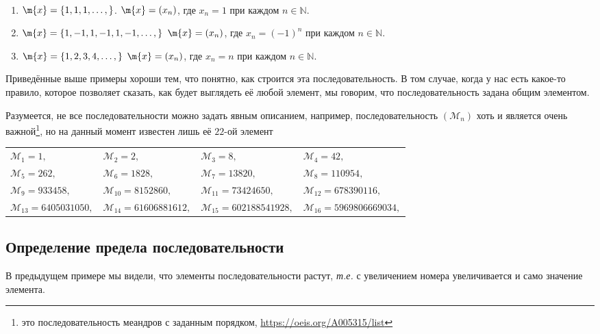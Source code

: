 \begin{example}~
    \begin{enumerate}
        \item $\m{x} = \{1,1,1,\ldots,\}$. \ie $\m{x} = (x_n)$, где $x_n = 1$ при каждом $n \in \mathbb{N}.$
        \item $\m{x} = \{1,-1,1,-1,1,-1,\ldots, \}$ \ie $\m{x} = (x_n)$, где $x_n = (-1)^n$ при каждом $n \in \mathbb{N}.$
        \item $\m{x} = \{1,2,3,4, \ldots,\}$ \ie $\m{x} = (x_n)$, где $x_n = n$ при каждом $n \in \mathbb{N}.$
    \end{enumerate}
\end{example}

Приведённые выше примеры хороши тем, что понятно, как строится эта последовательность. В том случае, когда у нас есть какое-то правило, которое позволяет сказать, как будет выглядеть её любой элемент, мы говорим, что последовательность задана общим элементом.

Разумеется, не все последовательности можно задать явным описанием, например, последовательность $(\mathscr{M}_n)$ хоть и является очень важной\footnote{это последовательность меандров с заданным порядком, \url{https://oeis.org/A005315/list}}, но на данный момент известен лишь её $22$-ой элемент
\begin{center}
 \begin{tabular}{llll}
    $\mathscr{M}_1=  1,$ & $\mathscr{M}_2 = 2,$ &  $\mathscr{M}_3 = 8,$ & $\mathscr{M}_4 = 42,$  \\
     $\mathscr{M}_5=  262,$ & $\mathscr{M}_6 = 1828,$ & $\mathscr{M}_7 = 13820,$ & $\mathscr{M}_8 = 110954,$ \\
     $\mathscr{M}_9=  933458,$ & $\mathscr{M}_{10} = 8152860,$ & $\mathscr{M}_{11} = 73424650,$ & $\mathscr{M}_{12} = 678390116,$ \\
    $\mathscr{M}_{13}=  6405031050,$ & $\mathscr{M}_{14} = 61606881612,$ & $\mathscr{M}_{15} = 602188541928,$ & $\mathscr{M}_{16} = 5969806669034,$
\end{tabular}
\end{center}

\subsection{Определение предела последовательности}

В предыдущем примере мы видели, что элементы последовательности растут, \textit{т.е.} с увеличением номера увеличивается и само значение элемента.




